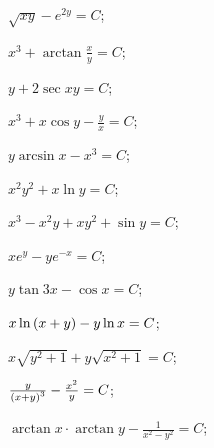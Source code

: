 \begin{enumsols}
		\item \( \sqrt{xy} - e^{2y} = C \); \sfill %
		\item \( x^3 + \arctan{\frac{x}{y}} = C \); \sfill %
		\item \( y + 2\sec{xy} = C \); \sfill %
		\item \( x^3 + x \cos{y} - \frac{y}{x} = C \); \sfill %
		\item \( y \arcsin{x} - x^3 = C \); \sfill %
		\item \( x^2 y^2 + x \ln{y} = C \); \sfill %
		\item \( x^3 - x^2 y + xy^2 + \sin{y} = C \); \sfill %
		\item \( xe^{y} - ye^{-x} = C \); \sfill %
		\item \( y \tan{3x} - \cos{x} = C \); \sfill %
		\item \( x \ln\left( x + y \right) - y \ln{x} = C \); \sfill %
		\item \( x \sqrt{y^2 + 1} + y \sqrt{x^2 + 1} = C \); \sfill %
		\item \( \frac{y}{\left( x + y \right)^3} - \frac{x^2}{y} = C \); \sfill %
		\item \( \arctan{x} \cdot \arctan{y} - \frac{1}{x^2 - y^2} = C \); \sfill %


\end{enumsols}
